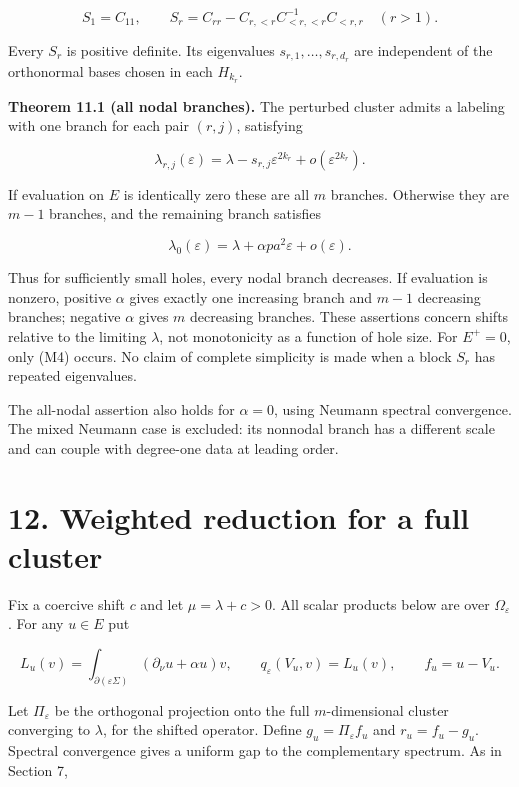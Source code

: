 \documentclass[11pt]{article}
\begin{document}
\[
 S_1=C_{11},\qquad
 S_r=C_{rr}-C_{r,<r}C_{<r,<r}^{-1}C_{<r,r}\quad(r>1).
 \tag{M2}
\]

Every \(S_r\) is positive definite. Its eigenvalues
\(s_{r,1},\ldots,s_{r,d_r}\) are independent of the orthonormal bases
chosen in each \(H_{k_r}\).

\textbf{Theorem 11.1 (all nodal branches).} The perturbed cluster admits
a labeling with one branch for each pair \((r,j)\), satisfying

\[
 \lambda_{r,j}(\varepsilon)
 =\lambda-s_{r,j}\varepsilon^{2k_r}
       +o(\varepsilon^{2k_r}).
 \tag{M3}
\]

If evaluation on \(E\) is identically zero these are all \(m\) branches.
Otherwise they are \(m-1\) branches, and the remaining branch satisfies

\[
 \lambda_0(\varepsilon)=\lambda+\alpha p a^2\varepsilon+o(\varepsilon).
 \tag{M4}
\]

Thus for sufficiently small holes, every nodal branch decreases. If
evaluation is nonzero, positive \(\alpha\) gives exactly one increasing
branch and \(m-1\) decreasing branches; negative \(\alpha\) gives \(m\)
decreasing branches. These assertions concern shifts relative to the
limiting \(\lambda\), not monotonicity as a function of hole size. For
\(E^+=0\), only (M4) occurs. No claim of complete simplicity is made
when a block \(S_r\) has repeated eigenvalues.

The all-nodal assertion also holds for \(\alpha=0\), using Neumann
spectral convergence. The mixed Neumann case is excluded: its nonnodal
branch has a different scale and can couple with degree-one data at
leading order.

\section{12. Weighted reduction for a full
cluster}\label{weighted-reduction-for-a-full-cluster}

Fix a coercive shift \(c\) and let \(\mu=\lambda+c>0\). All scalar
products below are over \(\Omega_\varepsilon\). For any \(u\in E\) put

\[
 L_u(v)=\int_{\partial(\varepsilon\Sigma)}
             (\partial_\nu u+\alpha u)v,
 \qquad q_\varepsilon(V_u,v)=L_u(v),\qquad f_u=u-V_u.
 \tag{M5}
\]

Let \(\Pi_\varepsilon\) be the orthogonal projection onto the full
\(m\)-dimensional cluster converging to \(\lambda\), for the shifted
operator. Define \(g_u=\Pi_\varepsilon f_u\) and \(r_u=f_u-g_u\).
Spectral convergence gives a uniform gap to the complementary spectrum.
As in Section 7,
\end{document}
